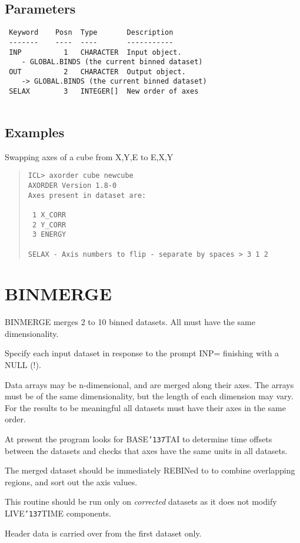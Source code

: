 \documentclass{book}
\renewcommand{\_}{{\tt\char'137}}     %
\begin{document}
\subsection{Parameters}
\begin{verbatim}
 Keyword    Posn  Type       Description
 -------    ----  ----       -----------
 INP          1   CHARACTER  Input object.
    - GLOBAL.BINDS (the current binned dataset)
 OUT          2   CHARACTER  Output object.
    -> GLOBAL.BINDS (the current binned dataset)
 SELAX        3   INTEGER[]  New order of axes
 
\end{verbatim}\subsection{Examples}
Swapping axes of a cube from X,Y,E to E,X,Y
\begin{quote}\begin{verbatim}
ICL> axorder cube newcube
AXORDER Version 1.8-0
Axes present in dataset are:
 
 1 X_CORR
 2 Y_CORR
 3 ENERGY
 
SELAX - Axis numbers to flip - separate by spaces > 3 1 2
\end{verbatim}\end{quote}
\section{BINMERGE}
BINMERGE merges 2 to 10 binned datasets. All must have the same
dimensionality.
 
Specify each input dataset in response to the prompt INP=
finishing with a NULL (!).
 
Data arrays may be n-dimensional, and are merged along their
axes. The arrays must be of the same dimensionality, but the
length of each dimension may vary. For the results to be
meaningful all datasets must have their axes in the same order.
 
At present the program looks for BASE\_TAI to determine time
offsets between the datasets and checks that axes have the same
units in all datasets.
 
The merged dataset should be immediately REBINed to to combine
overlapping regions, and sort out the axis values.
 
This routine should be run only on {\em corrected} datasets as it does
not modify LIVE\_TIME components.
 
Header data is carried over from the first dataset only.
 
\end{document}
